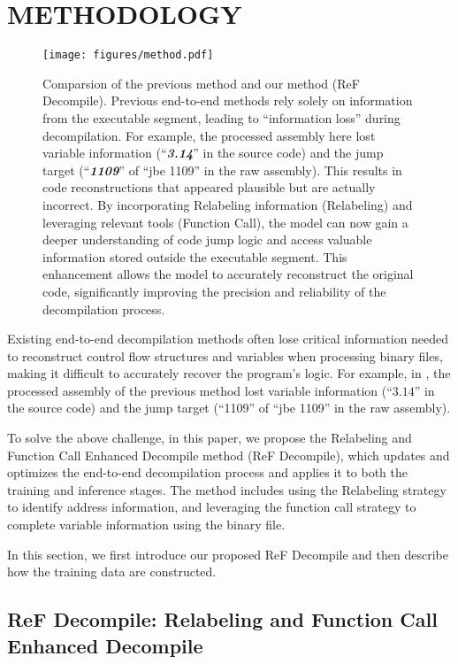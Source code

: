 \section{METHODOLOGY}
\label{sec:method}

\begin{figure}[t]
    \centering
    \texttt{[image: figures/method.pdf]}
    \caption{Comparsion of the previous method and our method (ReF Decompile). 
    Previous end-to-end methods rely solely on information from the executable segment, leading to ``information loss'' during decompilation. 
    For example, the processed assembly here lost variable information (“\textbf{\textit{3.14}}” in the source code) and the jump target (“\textbf{\textit{1109}}” of “jbe 1109” in the raw assembly).
    This results in code reconstructions that appeared plausible but are actually incorrect.
    By incorporating Relabeling information (Relabeling) and leveraging relevant tools (Function Call), the model can now gain a deeper understanding of code jump logic and access valuable information stored outside the executable segment. 
    This enhancement allows the model to accurately reconstruct the original code, significantly improving the precision and reliability of the decompilation process. }
    \label{fig:main-method}
\end{figure}

Existing end-to-end decompilation methods often lose critical information needed to reconstruct control flow structures and variables when processing binary files, making it difficult to accurately recover the program’s logic.  
For example, in , the processed assembly of the previous method lost variable information (``$3.14$'' in the source code) and the jump target (``1109'' of ``jbe 1109'' in the raw assembly).

To solve the above challenge, in this paper, we propose the Relabeling and Function Call Enhanced Decompile method (ReF Decompile), which updates and optimizes the end-to-end decompilation process and applies it to both the training and inference stages.
The method includes using the Relabeling strategy to identify address information, and leveraging the function call strategy to complete variable information using the binary file.

In this section, we first introduce our proposed ReF Decompile and then describe how the training data are constructed.


\subsection{ReF Decompile: Relabeling and Function Call Enhanced Decompile}

